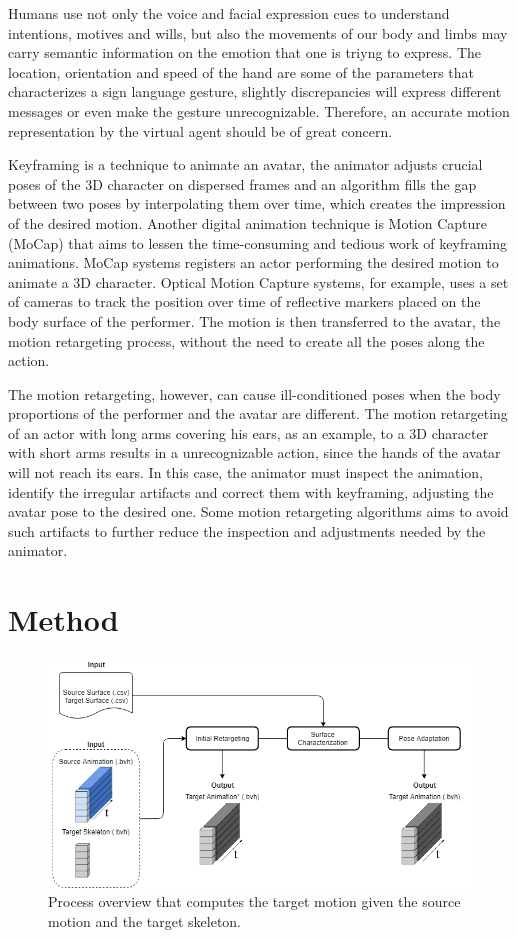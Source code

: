 \documentclass{vgtc}
\makeatletter
\def\maxwidth{\ifdim\Gin@nat@width>\linewidth\linewidth
    \else\Gin@nat@width\fi}
\let\Oldincludegraphics\includegraphics
\renewcommand{\includegraphics}[1]{\Oldincludegraphics[width=.8\maxwidth]{#1}}
\makeatother
\begin{document}
Humans use not only the voice and facial expression cues to understand
intentions, motives and wills, but also the movements of our body and
limbs may carry semantic information on the emotion that one is triyng
to express. The location, orientation and speed of the hand are some of
the parameters that characterizes a sign language gesture, slightly
discrepancies will express different messages or even make the gesture
unrecognizable. Therefore, an accurate motion representation by the
virtual agent should be of great concern.

Keyframing is a technique to animate an avatar, the animator adjusts
crucial poses of the 3D character on dispersed frames and an algorithm
fills the gap between two poses by interpolating them over time, which
creates the impression of the desired motion. Another digital animation
technique is Motion Capture (MoCap) that aims to lessen the
time-consuming and tedious work of keyframing animations. MoCap systems
registers an actor performing the desired motion to animate a 3D
character. Optical Motion Capture systems, for example, uses a set of
cameras to track the position over time of reflective markers placed on
the body surface of the performer. The motion is then transferred to the
avatar, the motion retargeting process, without the need to create all
the poses along the action.

The motion retargeting, however, can cause ill-conditioned poses when
the body proportions of the performer and the avatar are different. The
motion retargeting of an actor with long arms covering his ears, as an
example, to a 3D character with short arms results in a unrecognizable
action, since the hands of the avatar will not reach its ears. In this
case, the animator must inspect the animation, identify the irregular
artifacts and correct them with keyframing, adjusting the avatar pose to
the desired one. Some motion retargeting algorithms aims to avoid such
artifacts to further reduce the inspection and adjustments needed by the
animator.

    \section{Method}\label{method}

\begin{figure}
\centering
\includegraphics{../figures/Workflow3.png}
\caption{Process overview that computes the target motion given the
source motion and the target skeleton.}
\end{figure}
\end{document}
